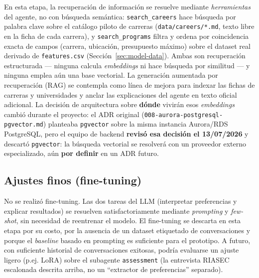 En esta etapa, la recuperaci\'on de informaci\'on se resuelve mediante
\emph{herramientas} del agente, no con b\'usqueda sem\'antica: \texttt{search\_careers}
hace b\'usqueda por palabra clave sobre el cat\'alogo piloto de carreras
(\texttt{data/careers/*.md}, texto libre en la ficha de cada carrera), y
\texttt{search\_programs} filtra y ordena por coincidencia exacta de campos
(carrera, ubicaci\'on, presupuesto m\'aximo) sobre el dataset real derivado de
\texttt{features.csv} (Secci\'on~\ref{sec:model-data}). Ambas son
recuperaci\'on estructurada --- ninguna calcula \emph{embeddings} ni hace
b\'usqueda por similitud --- y ninguna emplea a\'un una base vectorial. La
generaci\'on aumentada por recuperaci\'on (RAG) \cite{gao2024, fan2024} se
contempla como l\'inea de mejora para indexar las fichas de carreras y
universidades y anclar las explicaciones del agente en texto oficial
adicional. La decisi\'on de arquitectura sobre \textbf{d\'onde} vivir\'an esos
\emph{embeddings} cambi\'o durante el proyecto: el ADR original
(\texttt{008-aurora-postgresql-pgvector.md}) planteaba \texttt{pgvector} sobre
la misma instancia Aurora/RDS PostgreSQL, pero el equipo de backend
\textbf{revis\'o esa decisi\'on el 13/07/2026} y descart\'o \texttt{pgvector}:
la b\'usqueda vectorial se resolver\'a con un proveedor externo especializado,
a\'un \textbf{por definir} en un ADR futuro.

\subsection{Ajustes finos (fine-tuning)}

No se realiz\'o fine-tuning. Las dos tareas del LLM (interpretar preferencias y
explicar resultados) se resuelven satisfactoriamente mediante \emph{prompting} y
\emph{few-shot}, sin necesidad de reentrenar el modelo. El fine-tuning se
descarta en esta etapa por su costo, por la ausencia de un dataset etiquetado de
conversaciones y porque el \emph{baseline} basado en prompting es suficiente para
el prototipo. A futuro, con suficiente historial de conversaciones exitosas,
podr\'ia evaluarse un ajuste ligero (p.ej. LoRA) sobre el subagente
\texttt{assessment} (la entrevista RIASEC escalonada descrita arriba, no un
``extractor de preferencias'' separado).
